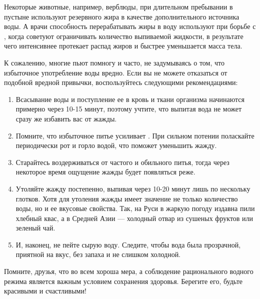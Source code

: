 Некоторые животные, например, верблюды, при длительном пребывании в пустыне используют  резервного жира в качестве дополнительного источника воды. А врачи способность перерабатывать жиры в воду используют при борьбе с , когда советуют ограничивать количество выпиваемой жидкости, в результате чего интенсивнее протекает распад жиров и быстрее уменьшается масса тела.

К сожалению, многие пьют помногу и часто, не задумываясь о том, что избыточное употребление воды вредно. Если вы не можете отказаться от подобной вредной привычки, воспользуйтесь следующими рекомендациями:

\begin{enumerate}
    \item Всасывание воды и поступление ее в кровь и ткани организма начинаются примерно через 10-15 минут, поэтому учтите, что выпитая вода не может сразу же избавить вас от жажды.

    \item Помните, что избыточное питье усиливает . При сильном потении поласкайте периодически рот и горло водой, что поможет уменьшить жажду.

    \item Старайтесь воздерживаться от частого и обильного питья, тогда через некоторое время ощущение жажды будет появляться реже.

    \item Утоляйте жажду постепенно, выпивая через 10-20 минут лишь по нескольку глотков. Хотя для утоления жажды имеет значение не только количество воды, но и ее вкусовые свойства. Так, на Руси в жаркую погоду издавна пили хлебный квас, а в Средней Азии --- холодный отвар из сушеных фруктов или зеленый чай.

    \item И, наконец, не пейте сырую воду. Следите, чтобы вода была прозрачной, приятной на вкус, без запаха и не слишком холодной.
\end{enumerate}

Помните, друзья, что во всем хороша мера, а соблюдение рационального водного режима является важным условием сохранения здоровья. Берегите его, будьте красивыми и счастливыми!
